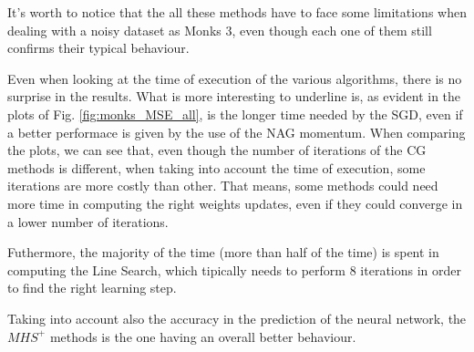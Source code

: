             It's worth to notice that the all these methods have to face some limitations when dealing with a noisy dataset as Monks 3, even though each one of them still confirms their typical behaviour.

            Even when looking at the time of execution of the various algorithms, there is no surprise in the results. What is more interesting to underline is, as evident in the plots of Fig. \ref{fig:monks_MSE_all}, is the longer time needed by the SGD, even if a better performace is given by the use of the NAG momentum.
            When comparing the plots, we can see that, even though the number of iterations of the CG methods is different, when taking into account the time of execution, some iterations are more costly than other. That means, some methods could need more time in computing the right weights updates, even if they could converge in a lower number of iterations.

            Futhermore, the majority of the time (more than half of the time) is spent in computing the Line Search, which tipically needs to perform 8 iterations in order to find the right learning step.

            Taking into account also the accuracy in the prediction of the neural network, the $MHS^+$ methods is the one having an overall better behaviour.

